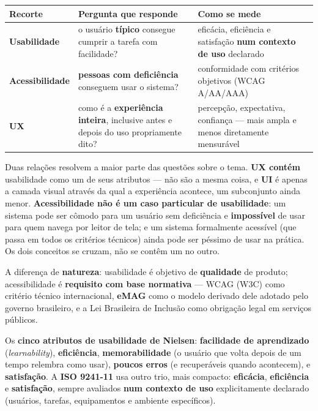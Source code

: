 \begin{conceito}
\begin{center}
\begin{tabular}{@{}p{2.9cm}p{4cm}p{4.5cm}@{}}
\toprule
\textbf{Recorte} & \textbf{Pergunta que responde} & \textbf{Como se
mede} \\
\midrule
\textbf{Usabilidade} & o usuário \textbf{típico} consegue cumprir a
tarefa com facilidade? & eficácia, eficiência e satisfação \textbf{num
contexto de uso} declarado \\
\textbf{Acessibilidade} & \textbf{pessoas com deficiência} conseguem
usar o sistema? & conformidade com critérios objetivos (WCAG A/AA/AAA) \\
\textbf{UX} & como é a \textbf{experiência inteira}, inclusive antes e
depois do uso propriamente dito? & percepção, expectativa, confiança ---
mais ampla e menos diretamente mensurável \\
\bottomrule
\end{tabular}
\end{center}

Duas relações resolvem a maior parte das questões sobre o tema.
\textbf{UX contém} usabilidade como um de seus atributos --- não são a
mesma coisa, e \textbf{UI} é apenas a camada visual através da qual a
experiência acontece, um subconjunto ainda menor. \textbf{Acessibilidade
não é um caso particular de usabilidade}: um sistema pode ser cômodo
para um usuário sem deficiência e \textbf{impossível} de usar para quem
navega por leitor de tela; e um sistema formalmente acessível (que passa
em todos os critérios técnicos) ainda pode ser péssimo de usar na
prática. Os dois conceitos se cruzam, não se contêm um no outro.

A diferença de \textbf{natureza}: usabilidade é objetivo de
\textbf{qualidade} de produto; acessibilidade é \textbf{requisito com
base normativa} --- WCAG (W3C) como critério técnico internacional,
\textbf{eMAG} como o modelo derivado dele adotado pelo governo
brasileiro, e a Lei Brasileira de Inclusão como obrigação legal em
serviços públicos.
\end{conceito}

\begin{conceito}
Os \textbf{cinco atributos de usabilidade de Nielsen}: \textbf{facilidade
de aprendizado} (\textit{learnability}), \textbf{eficiência},
\textbf{memorabilidade} (o usuário que volta depois de um tempo relembra
como usar), \textbf{poucos erros} (e recuperáveis quando acontecem), e
\textbf{satisfação}. A \textbf{ISO 9241-11} usa outro trio, mais
compacto: \textbf{eficácia}, \textbf{eficiência} e \textbf{satisfação},
sempre avaliados \textbf{num contexto de uso} explicitamente declarado
(usuários, tarefas, equipamentos e ambiente específicos).
\end{conceito}

